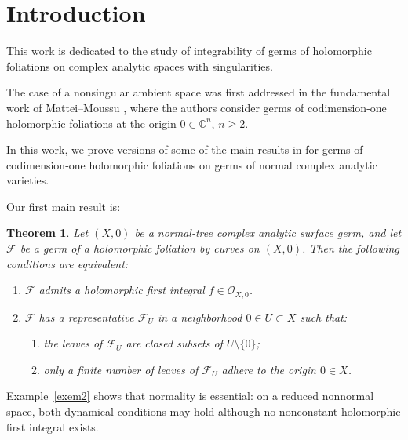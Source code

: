 \documentclass[11pt,twoside]{amsart}
\newcommand{\C}{\mathbb C}
\newcommand{\OO}{\mathcal O}
\newcommand{\F}{\mathcal F}
\newtheorem{mainthm}{Theorem}
\theoremstyle{definition}
\begin{document}
\maketitle




\tableofcontents



 \section{Introduction}\label{secintro}




This work is dedicated to the study of integrability of germs of holomorphic foliations on complex analytic spaces with singularities.

The case of a nonsingular ambient space was first addressed in the
fundamental work of Mattei--Moussu \cite{MatteiMoussu1980}, where the authors
consider germs of codimension-one holomorphic foliations at the origin
$0\in\C^n$, $n\geq2$.

In this work, we prove versions of some of the main results in \cite{MatteiMoussu1980} for germs of codimension-one holomorphic foliations on germs of normal complex analytic varieties.

Our first main result is:

\begin{mainthm}\label{thm:A}\normalfont
Let $(X,0)$ be a normal-tree complex analytic surface germ, and let $\F$
be a germ of a holomorphic foliation by curves on $(X,0)$. Then the
following conditions are equivalent:
\begin{enumerate}
\item[(i)] $\F$ admits a holomorphic first integral $f \in \OO_{X,0}$.
\item[(ii)] $\F$ has a representative $\F_U$ in a neighborhood $0 \in U \subset X$ such that:
\begin{enumerate}
\item[(ii.a)] the leaves of $\F_U$ are closed subsets of $U\setminus\{0\}$;
\item[(ii.b)] only a finite number of leaves of $\F_U$ adhere to the origin $0\in X$.
\end{enumerate}
\end{enumerate}
\end{mainthm}

Example~\ref{exem2} shows that normality is essential: on a reduced
nonnormal space, both dynamical conditions may hold although no
nonconstant holomorphic first integral exists.
\end{document}
